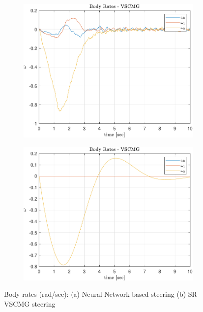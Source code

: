 \begin{figure}[ht]
     \centering
     \begin{subfigure}[b]{0.49\textwidth}
         \centering
         \includegraphics[width=\textwidth,trim={0 0 0 0.35cm},clip]{figures/plots/Results/vs-nn-w.pdf}
         \label{fig:nn_w}
     \end{subfigure}
     \begin{subfigure}[b]{0.49\textwidth}
         \centering
         \includegraphics[width=\textwidth,trim={0 0 0 0.35cm},clip]{figures/plots/Results/vs-vs-w.pdf}
         \label{fig:vs_w}
     \end{subfigure}
        \caption{Body rates (rad/sec): (a) Neural Network based steering (b) SR-VSCMG steering}
        \label{fig:nnvscmg_w}
\end{figure}

